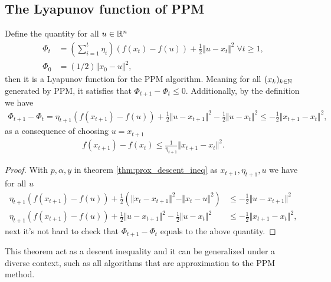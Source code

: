 \documentclass[12pt]{article}
\begin{document}
    \subsection{The Lyapunov function of PPM}
        \begin{theorem}
            Define the quantity for all $u \in \mathbb R^n$
            \begin{align*}
                \Phi_t &= 
                \left(
                    \sum_{i = 1}^{t} \eta_i
                \right)(f(x_t) - f(u)) + \frac{1}{2} \Vert u - x_t\Vert^2 \; \forall t \ge 1, 
                \\
                \Phi_0 &= (1/2)\Vert x_0 - u\Vert^2, 
            \end{align*}
            then it is a Lyapunov function for the PPM algorithm. 
            Meaning for all $(x_k)_{k \in \mathbb N}$ generated by PPM, it satisfies that $\Phi_{t + 1} - \Phi_t \le 0$. 
            Additionally, by the definition we have 
            \begin{align*}
                \Phi_{t + 1} - \Phi_{t} = 
                \eta_{t + 1}(f(x_{t + 1}) - f(u)) 
                + 
                \frac{1}{2}\Vert u - x_{t + 1}\Vert^2 
                -
                \frac{1}{2}\Vert u - x_t\Vert^2 
                \le 
                - \frac{1}{2}\Vert x_{t + 1} - x_t\Vert^2, 
            \end{align*}
            as a consequence of choosing $u = x_{t + 1}$
            \begin{align*}
                f(x_{t + 1}) - f(x_t) \le \frac{1}{\eta_{t + 1}}\Vert x_{t + 1} - x_t\Vert^2. 
            \end{align*}
        \end{theorem}
        \begin{proof}
            With $p, \alpha, y$ in theorem \ref*{thm:prox_descent_ineq} as $x_{t + 1}, \eta_{t + 1}, u$ we have for all $u$
            \begin{align*}
                \eta_{t + 1} (f(x_{t + 1}) - f(u)) + 
                \frac{1}{2}(
                    \Vert x_t - x_{t + 1} \Vert^2 
                    - 
                    \Vert x_t - u\Vert^2
                ) &\le 
                - \frac{1}{2}\Vert u - x_{t + 1}\Vert^2
                \\
                \eta_{t + 1}(f(x_{t + 1}) - f(u)) 
                + 
                \frac{1}{2}\Vert u - x_{t + 1}\Vert^2 
                -
                \frac{1}{2}\Vert u - x_t\Vert^2 
                & \le 
                - \frac{1}{2}\Vert x_{t + 1} - x_t\Vert^2, 
            \end{align*}
            next it's not hard to check that $\Phi_{t + 1} - \Phi_t$ equals to the above quantity. 
        \end{proof}
        \begin{remark}
            This theorem act as a descent inequality and it can be generalized under a diverse context, such as all algorithms that are approximation to the PPM method. 
        \end{remark}
\end{document}
